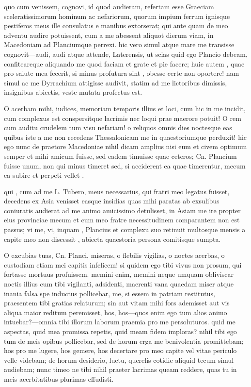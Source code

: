  quo cum venissem, cognovi, id quod audieram, refertam esse Graeciam sceleratissimorum hominum ac nefariorum, quorum impium ferrum ignisque pestiferos meus ille consulatus e manibus extorserat; qui ante quam de meo adventu audire potuissent, cum a me abessent aliquot dierum viam, in Macedoniam ad Planciumque perrexi. hic vero simul atque mare me transisse cognovit—audi, audi atque attende, Laterensis, ut scias quid ego Plancio debeam, confiteareque aliquando me quod faciam et grate et pie facere; huic autem , quae pro salute mea fecerit, si minus profutura sint , obesse certe non oportere! nam simul ac me Dyrrachium attigisse audivit, statim ad me lictoribus dimissis, insignibus abiectis, veste mutata profectus est.

 O acerbam mihi, iudices, memoriam temporis illius et loci, cum hic in me incidit, cum complexus est conspersitque lacrimis nec loqui prae maerore potuit! O rem cum auditu crudelem tum visu nefariam! o reliquos omnis dies noctesque eas quibus iste a me non recedens Thessalonicam me in quaestoriumque perduxit! hic ego nunc de praetore Macedoniae nihil dicam amplius nisi eum et civem optimum semper et mihi amicum fuisse, sed eadem timuisse quae ceteros; Cn. Plancium fuisse unum, non qui minus timeret sed, si acciderent ea quae timerentur, mecum ea subire et perpeti vellet .

 qui , cum ad me L. Tubero, meus necessarius, qui fratri meo legatus fuisset, decedens ex Asia venisset easque insidias quas mihi paratas ab exsulibus coniuratis audierat ad me animo amicissimo detulisset, in Asiam me ire propter eius provinciae mecum et cum meo fratre necessitudinem comparantem non est passus; vi me, vi, inquam , Plancius et complexu suo retinuit multosque mensis a capite meo non discessit , abiecta quaestoria persona comitisque sumpta.

 O excubias tuas, Cn. Planci, miseras, o flebilis vigilias, o noctes acerbas, o custodiam etiam mei capitis infelicem! si quidem ego tibi vivus non prosum, qui fortasse mortuus profuissem. memini enim, memini neque umquam obliviscar noctis illius cum tibi vigilanti, adsidenti, maerenti vana quaedam miser atque inania falsa spe inductus pollicebar, me, si essem in patriam restitutus, praesentem tibi gratias relaturum; sin aut vitam mihi fors ademisset aut vis aliqua maior reditum peremisset, hos, hos—quos enim ego tum alios animo intuebar?—omnia tibi illorum laborum praemia pro me persoluturos. quid me aspectas, quid mea promissa repetis, quid meam fidem imploras? nihil tibi ego tum de meis opibus pollicebar, sed de horum erga me benivolentia promittebam; hos pro me lugere, hos gemere, hos decertare pro meo capite vel vitae periculo velle videbam; de horum desiderio, luctu, querelis cotidie aliquid tecum simul audiebam; nunc timeo ne tibi nihil praeter lacrimas queam reddere, quas tu in meis acerbitatibus plurimas effudisti.

